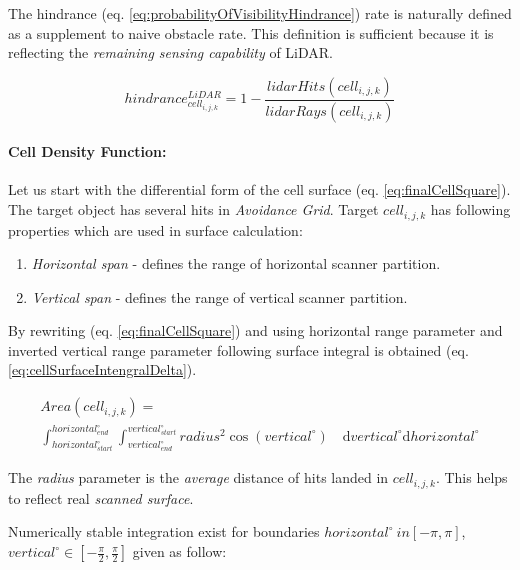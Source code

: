 \noindent The hindrance (eq. \ref{eq:probabilityOfVisibilityHindrance}) rate is naturally defined as a supplement to naive obstacle rate. This definition is sufficient because it is reflecting the \emph{remaining sensing capability} of  LiDAR.

\begin{equation}\label{eq:probabilityOfVisibilityHindrance}
    hindrance^{LiDAR}_{cell_{i,j,k}}=1-\frac{lidar Hits(cell_{i,j,k})}{lidar Rays(cell_{i,j,k})}
\end{equation}

\paragraph{Cell Density Function:}  Let us start with the differential form of the cell surface (eq. \ref{eq:finalCellSquare}). The target object has several hits in \emph{Avoidance Grid}. Target $cell_{i,j,k}$ has following properties which are used in surface calculation:
\begin{enumerate}
    \item \textit{Horizontal span} - defines the range of horizontal scanner partition.
    \item \textit{Vertical span} - defines the range of vertical scanner partition.
\end{enumerate}

\noindent By rewriting (eq. \ref{eq:finalCellSquare}) and using horizontal range parameter and inverted vertical range parameter following surface integral is obtained (eq. \ref{eq:cellSurfaceIntengralDelta}).

\begin{multline}\label{eq:cellSurfaceIntengralDelta}
    Area(cell_{i,j,k}) =\\ \int_{horizontal_{start}^\circ}^{horizontal_{end}^\circ}\int_{vertical_{end}^\circ}^{vertical_{start}^\circ} radius^2 \cos(vertical^\circ) \quad \text{d} vertical^
    \circ\text{d} horizontal^\circ
\end{multline}

\begin{note}
    The \emph{radius} parameter is the \emph{average} distance of hits landed in $cell_{i,j,k}$. This helps to reflect real \emph{scanned surface}.
\end{note}

\noindent Numerically stable integration exist for boundaries $horizontal^\circ \ in [-\pi,\pi]$, $vertical^\circ \in [-\frac{\pi}{2},\frac{\pi}{2}]$ given as follow:

